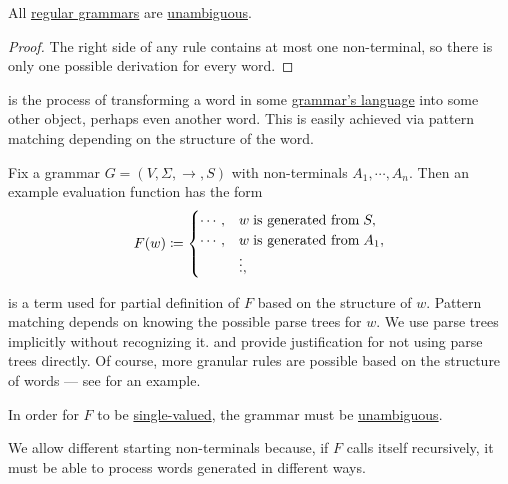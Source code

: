\begin{proposition}\label{thm:regular_grammars_are_unambiguous}
  All \hyperref[def:chomsky_hierarchy/regular]{regular grammars} are \hyperref[def:grammar_ambiguity]{unambiguous}.
\end{proposition}
\begin{proof}
  The right side of any rule contains at most one non-terminal, so there is only one possible derivation for every word.
\end{proof}

\begin{remark}\label{rem:evaluation}
   is the process of transforming a word in some \hyperref[def:formal_grammar/language]{grammar's language} into some other object, perhaps even another word. This is easily achieved via pattern matching depending on the structure of the word.

  Fix a grammar \( G = (V, \Sigma, \to, S) \) with non-terminals \( A_1, \cdots, A_n \). Then an example evaluation function has the form
  \begin{equation}\label{eq:rem:evaluation}
    F(w) \coloneqq \begin{cases}
      \cdots, &w \T{is generated from} S, \\
      \cdots, &w \T{is generated from} A_1, \\
              &\vdots,
    \end{cases}
  \end{equation}

   is a term used for partial definition of \( F \) based on the structure of \( w \). Pattern matching depends on knowing the possible parse trees for \( w \). We use parse trees implicitly without recognizing it.  and  provide justification for not using parse trees directly. Of course, more granular rules are possible based on the structure of words --- see  for an example.
\end{remark}
\begin{comments}
  \item In order for \( F \) to be \hyperref[def:function]{single-valued}, the grammar must be \hyperref[def:grammar_derivation/unambiguous]{unambiguous}.
  \item We allow different starting non-terminals because, if \( F \) calls itself recursively, it must be able to process words generated in different ways.
\end{comments}

